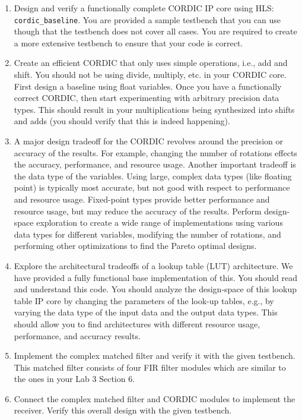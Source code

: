 \documentclass[a4paper,12pt,twoside]{article}
\begin{document}
\begin{enumerate}
    \item Design and verify a functionally complete CORDIC IP core using HLS: \texttt{cordic\_baseline}. You are provided a sample testbench that you can use though that the testbench does not cover all cases. You are required to create a more extensive testbench to ensure that your code is correct.
    \item Create an efficient CORDIC that only uses simple operations, i.e., add and shift. You should not be using divide, multiply, etc. in your CORDIC core. First design a baseline using float variables. Once you have a functionally correct CORDIC, then start experimenting with arbitrary precision data types. This should result in your multiplications being synthesized into shifts and adds (you should verify that this is indeed happening).
    \item A major design tradeoff for the CORDIC revolves around the precision or accuracy of the results. For example, changing the number of rotations effects the accuracy, performance, and resource usage. Another important tradeoff is the data type of the variables. Using large, complex data types (like floating point) is typically most accurate, but not good with respect to performance and resource usage. Fixed-point types provide better performance and resource usage, but may reduce the accuracy of the results. Perform design-space exploration to create a wide range of implementations using various data types for different variables, modifying the number of rotations, and performing other optimizations to find the Pareto optimal designs.
    \item Explore the architectural tradeoffs of a lookup table (LUT) architecture. We have provided a fully functional base implementation of this. You should read and understand this code. You should analyze the design-space of this lookup table IP core by changing the parameters of the look-up tables, e.g., by varying the data type of the input data and the output data types. This should allow you to find architectures with different resource usage, performance, and accuracy results.
    \item Implement the complex matched filter and verify it with the given testbench. This matched filter consists of four FIR filter modules which are similar to the ones in your Lab 3 Section 6.
    \item Connect the complex matched filter and CORDIC modules to implement the receiver. Verify this overall design with the given testbench.

\end{enumerate}
\end{document}
